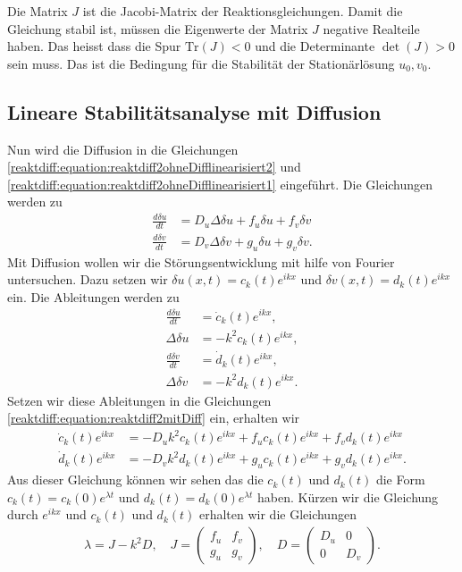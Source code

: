 Die Matrix \(J\) ist die Jacobi-Matrix der Reaktionsgleichungen.
Damit die Gleichung stabil ist, müssen die Eigenwerte der Matrix \(J\) negative Realteile haben.
Das heisst dass die Spur \(\text{Tr}(J) < 0\) und die Determinante \(\det(J) > 0\) sein muss.
Das ist die Bedingung für die Stabilität der Stationärlösung \(u_0, v_0\).

\subsection{Lineare Stabilitätsanalyse mit Diffusion
\label{reaktdiff:section:matheDiff}}
Nun wird die Diffusion in die Gleichungen \ref{reaktdiff:equation:reaktdiff2ohneDifflinearisiert2} und \ref{reaktdiff:equation:reaktdiff2ohneDifflinearisiert1} eingeführt.
Die Gleichungen werden zu
\begin{align}
    \label{reaktdiff:equation:reaktdiff2mitDiff}
    \frac{d \delta u}{dt} &= D_u \Delta \delta u + 
    f_u \delta u + f_v \delta v\\
    \frac{d \delta v}{dt} &= D_v \Delta \delta v + 
    g_u \delta u + g_v \delta v.
\end{align}
Mit Diffusion wollen wir die Störungsentwicklung mit hilfe von Fourier untersuchen.
Dazu setzen wir \(\delta u(x,t) = c_k(t) e^{ikx}\) und \(\delta v(x,t) = d_k(t) e^{ikx}\) ein.
Die Ableitungen werden zu
\begin{align*}
    \frac{d\delta u}{d t} &= \dot{c}_k(t) e^{ikx},\\
    \Delta \delta u &= -k^2 c_k(t) e^{ikx},\\
    \frac{d\delta v}{d t} &= \dot{d}_k(t) e^{ikx},\\
    \Delta \delta v &= -k^2 d_k(t) e^{ikx}.
\end{align*}
Setzen wir diese Ableitungen in die Gleichungen \ref{reaktdiff:equation:reaktdiff2mitDiff} ein, erhalten wir
\begin{align}
    \label{reaktdiff:equation:reaktdiff2mitDiffFourier}
    \dot{c}_k(t) e^{ikx} &= -D_u k^2 c_k(t) e^{ikx} + 
    f_u c_k(t) e^{ikx} + f_v d_k(t) e^{ikx}\\
    \dot{d}_k(t) e^{ikx} &= -D_v k^2 d_k(t) e^{ikx} + 
    g_u c_k(t) e^{ikx} + g_v d_k(t) e^{ikx}.
\end{align}
Aus dieser Gleichung können wir sehen das die \(c_k(t)\) und \(d_k(t)\) die Form \(c_k(t) = c_k(0) e^{\lambda t}\) und \(d_k(t) = d_k(0) e^{\lambda t}\) haben.
Kürzen wir die Gleichung durch \(e^{ikx}\) und \(c_k(t)\) und \(d_k(t)\) erhalten wir die Gleichungen
\begin{align}
    \label{reaktdiff:equation:reaktdiff2mitDiffFourierk}
    \lambda = J - k^2 D, \quad 
    J =
    \begin{pmatrix}
        f_u & f_v\\
        g_u & g_v
    \end{pmatrix}, \quad
    D =
    \begin{pmatrix}
        D_u & 0\\
        0 & D_v
    \end{pmatrix}.
\end{align}
